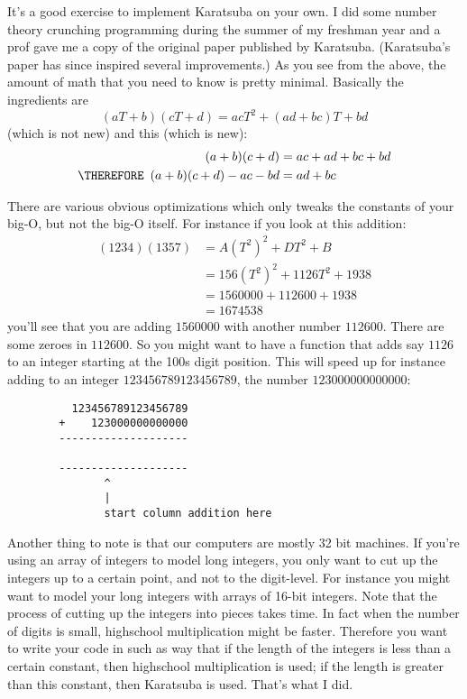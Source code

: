 It's a good exercise to implement Karatsuba on your own.
I did some number theory crunching programming during the
summer of my freshman
year and a prof gave me a copy of the original 
paper published by Karatsuba.
(Karatsuba's paper has since inspired several improvements.)
As you see from the above, the amount of math that you need to know
is pretty minimal.
Basically the ingredients are
\[
(aT + b)(cT + d) = acT^2 + (ad + bc)T + bd
\]
(which is not new) and this (which is new):
\begin{align*}
(a+b)(c+d) &= ac + ad + bc + bd \\
\THEREFORE \,\,\, (a+b)(c+d) - ac - bd &= ad + bc
\end{align*}

There are various obvious optimizations which only tweaks the
constants of your big-O, but not the big-O itself. 
For instance if you look at this addition:
\begin{align*}
(1234)(1357)  
&= A(T^2)^2 + D T^2 + B \\
&= 156(T^2)^2 + 1126 T^2 + 1938 \\
&= 1560000 + 112600 + 1938 \\
&= 1674538
\end{align*}
you'll see that you are adding $1560000$ with another number $112600$.
There are some zeroes in $112600$.
So you might want to have a function that adds say $1126$ to an integer
starting at the 100s digit position.
This will speed up for instance adding to an integer $123456789123456789$, 
the number
$123000000000000$:
\begin{Verbatim}
          123456789123456789
        +    123000000000000
        --------------------

        --------------------
               ^
               |
               start column addition here
\end{Verbatim}

Another thing to note is that our computers are mostly 32 bit machines.
If you're using an array of integers to model long integers,
you only want to cut up the integers up to a certain point, and not
to the digit-level.
For instance you might want to model your long integers
with arrays of 16-bit integers.
Note that the process of cutting up the integers into pieces
takes time.
In fact when the number of digits is small, highschool multiplication
might be faster.
Therefore you want to write your code in such as way that 
if the length of the integers is less than a certain constant,
then highschool multiplication is used;
if the length is greater than this constant, then Karatsuba is used.
That's what I did.

